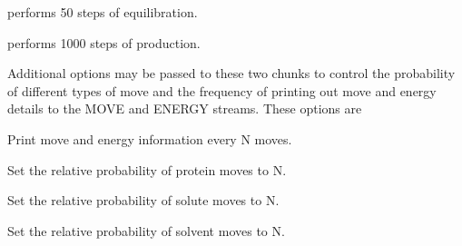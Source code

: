 \documentclass[letterpaper,10pt,english]{sphinxmanual}
\begin{document}
performs 50 steps of equilibration.

\ignorespaces 
\def\sphinxLiteralBlockLabel{\label{\detokenize{protoms:index-69}}}
%
\begin{sphinxVerbatim}[commandchars=\\\{\}]
  
\end{sphinxVerbatim}

performs 1000 steps of production.

Additional options may be passed to these two chunks to control the probability of different types of move and the frequency of printing out move and energy details to the MOVE and ENERGY streams. These options are

\ignorespaces 
\def\sphinxLiteralBlockLabel{\label{\detokenize{protoms:index-70}}}
%
\begin{sphinxVerbatim}[commandchars=\\\{\}]
\end{sphinxVerbatim}

Print move and energy information every N moves.

%
\begin{sphinxVerbatim}[commandchars=\\\{\}]
\end{sphinxVerbatim}

Set the relative probability of protein moves to N.

%
\begin{sphinxVerbatim}[commandchars=\\\{\}]
\end{sphinxVerbatim}

Set the relative probability of solute moves to N.

%
\begin{sphinxVerbatim}[commandchars=\\\{\}]
\end{sphinxVerbatim}

Set the relative probability of solvent moves to N.

%
\begin{sphinxVerbatim}[commandchars=\\\{\}]
\end{sphinxVerbatim}
\end{document}
